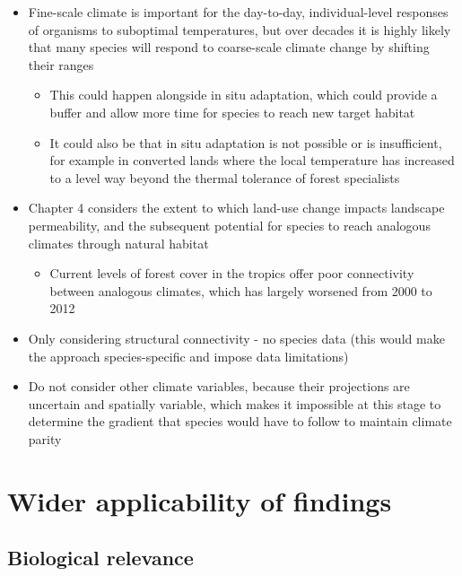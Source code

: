 \documentclass[12pt,a4paper,]{report}
\providecommand{\tightlist}{%
  \setlength{\itemsep}{0pt}\setlength{\parskip}{0pt}}
\theoremstyle{definition}
\theoremstyle{definition}
\theoremstyle{definition}
\theoremstyle{remark}
\begin{document}
\begin{itemize}
\tightlist
\item
  Fine-scale climate is important for the day-to-day, individual-level
  responses of organisms to suboptimal temperatures, but over decades it
  is highly likely that many species will respond to coarse-scale
  climate change by shifting their ranges

  \begin{itemize}
  \tightlist
  \item
    This could happen alongside in situ adaptation, which could provide
    a buffer and allow more time for species to reach new target habitat
  \item
    It could also be that in situ adaptation is not possible or is
    insufficient, for example in converted lands where the local
    temperature has increased to a level way beyond the thermal
    tolerance of forest specialists
  \end{itemize}
\item
  Chapter 4 considers the extent to which land-use change impacts
  landscape permeability, and the subsequent potential for species to
  reach analogous climates through natural habitat

  \begin{itemize}
  \tightlist
  \item
    Current levels of forest cover in the tropics offer poor
    connectivity between analogous climates, which has largely worsened
    from 2000 to 2012
  \end{itemize}
\item
  Only considering structural connectivity - no species data (this would
  make the approach species-specific and impose data limitations)
\item
  Do not consider other climate variables, because their projections are
  uncertain and spatially variable, which makes it impossible at this
  stage to determine the gradient that species would have to follow to
  maintain climate parity
\end{itemize}

\section{Wider applicability of
findings}\label{wider-applicability-of-findings}

\subsection{Biological relevance}\label{biological-relevance}
\end{document}
